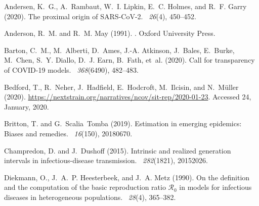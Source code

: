 \documentclass[12pt]{article}
\begin{document}
\pagebreak

\begin{thebibliography}{}

Andersen, K.~G., A.~Rambaut, W.~I. Lipkin, E.~C. Holmes, and R.~F. Garry
  (2020).
\newblock The proximal origin of {SARS-CoV-2}.
~{\em 26\/}(4), 450--452.

Anderson, R.~M. and R.~M. May (1991).
.
\newblock Oxford University Press.

Barton, C.~M., M.~Alberti, D.~Ames, J.-A. Atkinson, J.~Bales, E.~Burke,
  M.~Chen, S.~Y. Diallo, D.~J. Earn, B.~Fath, et~al. (2020).
\newblock Call for transparency of {COVID-19} models.
~{\em 368\/}(6490), 482--483.

Bedford, T., R.~Neher, J.~Hadfield, E.~Hodcroft, M.~Ilcisin, and N.~M{\"u}ller
  (2020).
\newblock \url{https://nextstrain.org/narratives/ncov/sit-rep/2020-01-23}.
  Accessed 24, January, 2020.

Britton, T. and G.~Scalia~Tomba (2019).
\newblock Estimation in emerging epidemics: Biases and remedies.
~{\em 16\/}(150), 20180670.

Champredon, D. and J.~Dushoff (2015).
\newblock Intrinsic and realized generation intervals in infectious-disease
  transmission.
~{\em 282\/}(1821), 20152026.

Diekmann, O., J.~A.~P. Heesterbeek, and J.~A. Metz (1990).
\newblock On the definition and the computation of the basic reproduction ratio
  $\mathcal{R}_0$ in models for infectious diseases in heterogeneous
  populations.
~{\em 28\/}(4), 365--382.


\end{thebibliography}
\end{document}
